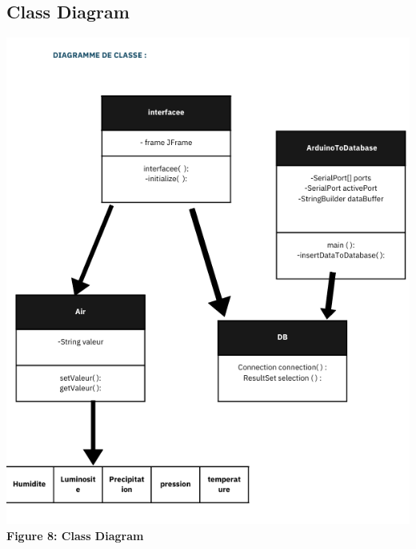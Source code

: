 \documentclass[a4paper,12pt]{article}
\begin{document}
	\subsection{Class Diagram}
	\begin{center}
		\includegraphics[width=\textwidth]{diagdeclass.png}\\
		\textbf{Figure 8: Class Diagram}
	\end{center}
	
\end{document}
